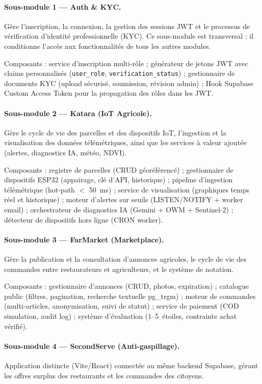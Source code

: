 \documentclass[12pt,a4paper]{report}
\newcommand{\code}[1]{\texttt{\small #1}}
\begin{document}
\paragraph{Sous-module 1 --- Auth \& KYC.}
Gère l'inscription, la connexion, la gestion des sessions JWT et le processus de
vérification d'identité professionnelle (KYC). Ce sous-module est transversal : il
conditionne l'accès aux fonctionnalités de tous les autres modules.

Composants : service d'inscription multi-rôle ; générateur de jetons JWT avec claims
personnalisés (\code{user\_role}, \code{verification\_status}) ; gestionnaire de
documents KYC (upload sécurisé, soumission, révision admin) ; Hook Supabase Custom
Access Token pour la propagation des rôles dans les JWT.

\paragraph{Sous-module 2 --- Katara (IoT Agricole).}
Gère le cycle de vie des parcelles et des dispositifs IoT, l'ingestion et la
visualisation des données télémétriques, ainsi que les services à valeur ajoutée
(alertes, diagnostics IA, météo, NDVI).

Composants : registre de parcelles (CRUD géoréférencé) ; gestionnaire de dispositifs
ESP32 (appairage, clé d'API, historique) ; pipeline d'ingestion télémétrique
(hot-path $<$ 50~ms) ; service de visualisation (graphiques temps réel et historique) ;
moteur d'alertes sur seuils (LISTEN/NOTIFY + worker email) ; orchestrateur de
diagnostics IA (Gemini + OWM + Sentinel-2) ; détecteur de dispositifs hors ligne
(CRON worker).

\paragraph{Sous-module 3 --- FarMarket (Marketplace).}
Gère la publication et la consultation d'annonces agricoles, le cycle de vie des
commandes entre restaurateurs et agriculteurs, et le système de notation.

Composants : gestionnaire d'annonces (CRUD, photos, expiration) ; catalogue public
(filtres, pagination, recherche textuelle pg\_trgm) ; moteur de commandes
(multi-articles, anonymisation, suivi de statut) ; service de paiement (COD
simulation, audit log) ; système d'évaluation (1--5~étoiles, contrainte achat
vérifié).

\paragraph{Sous-module 4 --- SecondServe (Anti-gaspillage).}
Application distincte (Vite/React) connectée au même backend Supabase, gérant les
offres surplus des restaurants et les commandes des citoyens.
\end{document}
